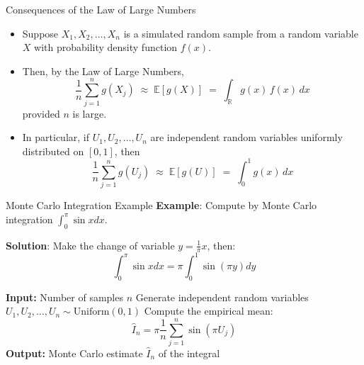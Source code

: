 \documentclass[8pt]{beamer}
\begin{document}
\begin{frame}{Consequences of the Law of Large Numbers}
\begin{itemize}
  \item Suppose $X_1, X_2, \ldots, X_n$ is a simulated random sample from a random variable $X$ with probability density function $f(x)$.
  \item Then, by the Law of Large Numbers,
  \begin{equation*}
  	\frac{1}{n} \sum_{j=1}^{n} g(X_j) \;\approx\; \mathbb{E}[g(X)] \;=\; \int_{\mathbb{R}} g(x)\, f(x)\, dx
  \end{equation*}
  provided $n$ is large.
  \item In particular, if $U_1, U_2, \ldots, U_n$ are independent random variables uniformly distributed on $[0,1]$, then
  \begin{equation*}
  	\frac{1}{n} \sum_{j=1}^{n} g(U_j) \;\approx\; \mathbb{E}[g(U)] \;=\; \int_{0}^{1} g(x)\, dx
  \end{equation*}  
\end{itemize}
\end{frame}

\begin{frame}[fragile]{Monte Carlo Integration Example} 
\textbf{Example}: Compute by Monte Carlo integration $\displaystyle{\int_0^{\pi} \sin x dx}$.

\vspace{3mm}

\textbf{Solution}: Make the change of variable $\displaystyle{y=\frac{1}{\pi}x}$, then:
\begin{equation*}
    \int_0^{\pi} \sin x dx= \pi \int_0^{1} \sin (\pi y) dy
\end{equation*}
   
\begin{algorithm}[H]
\caption{Monte Carlo Estimation of $\displaystyle \pi \int_0^1 \sin(\pi x)\,dx$}
\label{alg:monte-carlo-sine}
\begin{algorithmic}[1]
  \State \textbf{Input:} Number of samples $n$
  \State Generate independent random variables $U_1, U_2, \ldots, U_n \sim \text{Uniform}(0,1)$
  \State Compute the empirical mean:
  \begin{equation*}
  	\widehat{I}_n = \pi \frac{1}{n} \sum_{j=1}^{n} \sin(\pi U_j)
  \end{equation*}
  \State \textbf{Output:} Monte Carlo estimate $\widehat{I}_n$ of the integral
\end{algorithmic}
\end{algorithm}
\end{frame}
\end{document}
